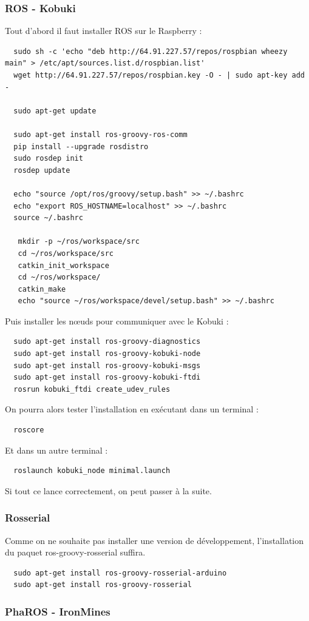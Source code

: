 \documentclass[a4paper, 11pt]{article}
\begin{document}
\subsubsection{ROS - Kobuki}
Tout d'abord il faut installer ROS sur le Raspberry : 
\begin{lstlisting}
  sudo sh -c 'echo "deb http://64.91.227.57/repos/rospbian wheezy main" > /etc/apt/sources.list.d/rospbian.list'
  wget http://64.91.227.57/repos/rospbian.key -O - | sudo apt-key add -

  sudo apt-get update

  sudo apt-get install ros-groovy-ros-comm
  pip install --upgrade rosdistro
  sudo rosdep init
  rosdep update

  echo "source /opt/ros/groovy/setup.bash" >> ~/.bashrc
  echo "export ROS_HOSTNAME=localhost" >> ~/.bashrc
  source ~/.bashrc

   mkdir -p ~/ros/workspace/src
   cd ~/ros/workspace/src
   catkin_init_workspace
   cd ~/ros/workspace/
   catkin_make
   echo "source ~/ros/workspace/devel/setup.bash" >> ~/.bashrc
\end{lstlisting}
Puis installer les n{\oe}uds pour communiquer avec le Kobuki : 
\begin{lstlisting}
  sudo apt-get install ros-groovy-diagnostics
  sudo apt-get install ros-groovy-kobuki-node 
  sudo apt-get install ros-groovy-kobuki-msgs
  sudo apt-get install ros-groovy-kobuki-ftdi
  rosrun kobuki_ftdi create_udev_rules
\end{lstlisting}
On pourra alors tester l'installation en exécutant dans un terminal :
\begin{verbatim}
  roscore
\end{verbatim}
Et dans un autre terminal : 
\begin{verbatim}
  roslaunch kobuki_node minimal.launch
\end{verbatim}
Si tout ce lance correctement, on peut passer à la suite.
\subsubsection{Rosserial}
Comme on ne souhaite pas installer une version de développement,
l'installation du paquet ros-groovy-rosserial suffira.
\begin{lstlisting}
  sudo apt-get install ros-groovy-rosserial-arduino
  sudo apt-get install ros-groovy-rosserial
\end{lstlisting}

\subsubsection{PhaROS - IronMines}
\end{document}
